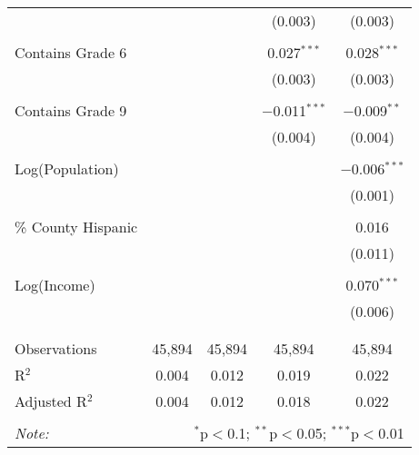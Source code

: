 \begin{table}[!htbp]
\begin{tabular}{@{\extracolsep{-2pt}}lcccc}
  &  &  & (0.003) & (0.003) \\ 
  & & & & \\ 
 Contains Grade 6 &  &  & 0.027$^{***}$ & 0.028$^{***}$ \\ 
  &  &  & (0.003) & (0.003) \\ 
  & & & & \\ 
 Contains Grade 9 &  &  & $-$0.011$^{***}$ & $-$0.009$^{**}$ \\ 
  &  &  & (0.004) & (0.004) \\ 
  & & & & \\ 
 Log(Population) &  &  &  & $-$0.006$^{***}$ \\ 
  &  &  &  & (0.001) \\ 
  & & & & \\ 
 \% County Hispanic &  &  &  & 0.016 \\ 
  &  &  &  & (0.011) \\ 
  & & & & \\ 
 Log(Income) &  &  &  & 0.070$^{***}$ \\ 
  &  &  &  & (0.006) \\ 
  & & & & \\ 
\hline \\[-1.8ex] 
Observations & 45,894 & 45,894 & 45,894 & 45,894 \\ 
R$^{2}$ & 0.004 & 0.012 & 0.019 & 0.022 \\ 
Adjusted R$^{2}$ & 0.004 & 0.012 & 0.018 & 0.022 \\ 
\hline 
\hline \\[-1.8ex] 
\textit{Note:}  & \multicolumn{4}{r}{$^{*}$p$<$0.1; $^{**}$p$<$0.05; $^{***}$p$<$0.01} \\ 
\end{tabular} 
\end{table} 
